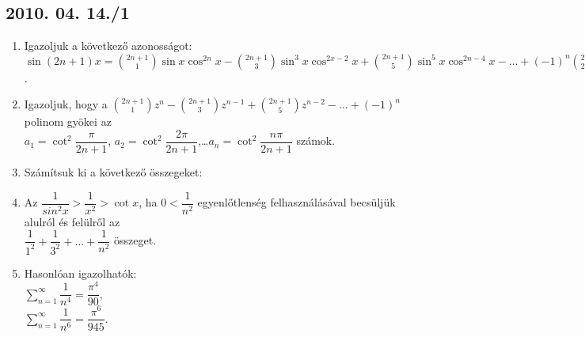 \subsection*{2010. 04. 14./1}
\begin{enumerate}
\item Igazoljuk a következő azonosságot:\\
$\sin(2n+1)x=\binom{2n+1}{1}\sin x\cos^{2n} x-\binom{2n+1}{3}\sin^3 x\cos^{2x-2} x+\binom{2n+1}{5}\sin^5 x \cos^{2n-4} x-\ldots+(-1)^n\binom{2n+1}{2n+1}\sin^{2n+1}x$.
\item Igazoljuk, hogy a $\binom{2n+1}{1}z^n-\binom{2n+1}{3}z^{n-1}+\binom{2n+1}{5}z^{n-2}-\ldots+(-1)^n$ polinom gyökei az \\
$a_1=\cot^2\dfrac{\pi}{2n+1}$, $a_2=\cot^2\dfrac{2\pi}{2n+1}$,\ldots $a_n=\cot^2\dfrac{n\pi}{2n+1}$ számok.
\item Számítsuk ki a következő összegeket:
\item Az $\dfrac{1}{sin^2 x}>\dfrac{1}{x^2}>\cot x$, ha $0<\dfrac{1}{n^2}$ egyenlőtlenség felhasználásával becsüljük alulról és felülről az\\
$\dfrac{1}{1^2}+\dfrac{1}{3^2}+\ldots+\dfrac{1}{n^2}$ összeget.\\
\item Hasonlóan igazolhatók:\\
$\displaystyle\sum_{n=1}^{\infty}\dfrac{1}{n^4}=\dfrac{\pi^4}{90}$,\\
$\displaystyle\sum_{n=1}^{\infty}\dfrac{1}{n^6}=\dfrac{\pi^6}{945}$.

\end{enumerate}

